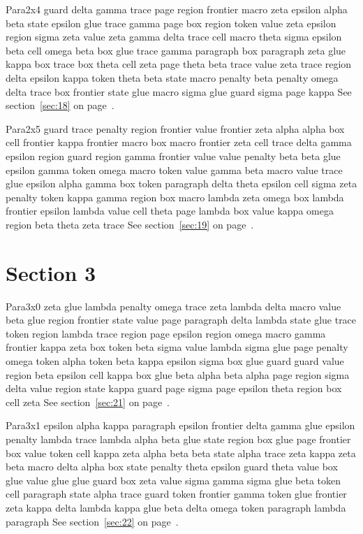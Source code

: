 \documentclass{article}
\begin{document}
Para2x4 guard delta gamma trace page region frontier macro zeta epsilon alpha beta state epsilon glue trace gamma page box region token value zeta epsilon region sigma zeta value zeta gamma delta trace cell macro theta sigma epsilon beta cell omega beta box glue trace gamma paragraph box paragraph zeta glue kappa box trace box theta cell zeta page theta beta trace value zeta trace region delta epsilon kappa token theta beta state macro penalty beta penalty omega delta trace box frontier state glue macro sigma glue guard sigma page kappa See section~\ref{sec:18} on page~\pageref{sec:10}.

Para2x5 guard trace penalty region frontier value frontier zeta alpha alpha box cell frontier kappa frontier macro box macro frontier zeta cell trace delta gamma epsilon region guard region gamma frontier value value penalty beta beta glue epsilon gamma token omega macro token value gamma beta macro value trace glue epsilon alpha gamma box token paragraph delta theta epsilon cell sigma zeta penalty token kappa gamma region box macro lambda zeta omega box lambda frontier epsilon lambda value cell theta page lambda box value kappa omega region beta theta zeta trace See section~\ref{sec:19} on page~\pageref{sec:11}.

\section{Section 3}\label{sec:3}
Para3x0 zeta glue lambda penalty omega trace zeta lambda delta macro value beta glue region frontier state value page paragraph delta lambda state glue trace token region lambda trace region page epsilon region omega macro gamma frontier kappa zeta box token beta sigma value lambda sigma glue page penalty omega token alpha token beta kappa epsilon sigma box glue guard guard value region beta epsilon cell kappa box glue beta alpha beta alpha page region sigma delta value region state kappa guard page sigma page epsilon theta region box cell zeta See section~\ref{sec:21} on page~\pageref{sec:9}.

Para3x1 epsilon alpha kappa paragraph epsilon frontier delta gamma glue epsilon penalty lambda trace lambda alpha beta glue state region box glue page frontier box value token cell kappa zeta alpha beta beta state alpha trace zeta kappa zeta beta macro delta alpha box state penalty theta epsilon guard theta value box glue value glue glue guard box zeta value sigma gamma sigma glue beta token cell paragraph state alpha trace guard token frontier gamma token glue frontier zeta kappa delta lambda kappa glue beta delta omega token paragraph lambda paragraph See section~\ref{sec:22} on page~\pageref{sec:10}.
\end{document}
